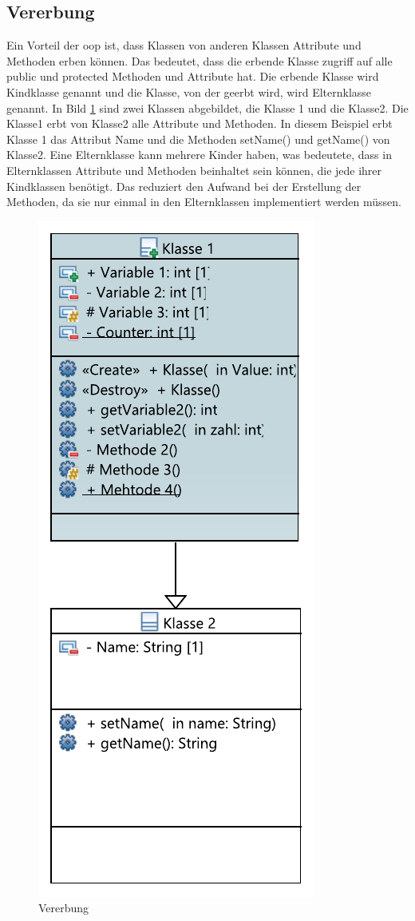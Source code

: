 \subsection{Vererbung}
Ein Vorteil der \ac{oop} ist, dass Klassen von anderen Klassen Attribute und Methoden erben können. Das bedeutet, dass die erbende Klasse zugriff auf alle \glqq public\grqq{} und  \glqq protected\grqq{} Methoden und Attribute hat. Die erbende Klasse wird Kindklasse genannt und die Klasse, von der geerbt wird, wird Elternklasse genannt. In Bild \ref{fig:vererbung} sind zwei Klassen abgebildet, die Klasse 1 und die Klasse2. Die Klasse1 erbt von Klasse2 alle Attribute und Methoden. In diesem Beispiel erbt Klasse 1 das Attribut   \glqq Name\grqq{} und die Methoden  \glqq setName()\grqq{} und  \glqq getName()\grqq{} von Klasse2. Eine Elternklasse kann mehrere Kinder haben, was bedeutete, dass in Elternklassen Attribute und Methoden beinhaltet sein können, die jede ihrer Kindklassen benötigt. Das reduziert den Aufwand bei der Erstellung der Methoden, da sie nur einmal in den Elternklassen implementiert werden müssen.   
 \begin{figure}[H]
	\centering
	\includegraphics[scale=1]{bilder/pdfvorlagen/vererbung.pdf}
	\caption[Vererbung]{Vererbung}
	\label{fig:vererbung}
\end{figure}
